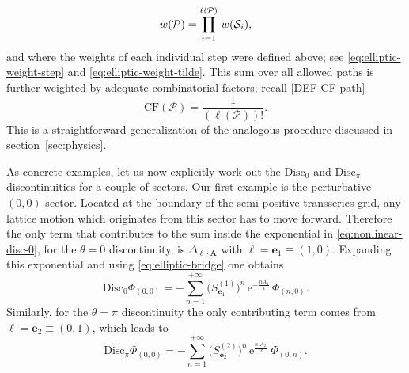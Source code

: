 \documentclass[11pt,a4paper]{article}
\newcommand{\CP}{{\cal P}}
\newcommand{\be}{\begin{equation}}
\newcommand{\ee}{\end{equation}}
\def\disc{{\mathrm{Disc}}}
\begin{document}
%
\begin{equation}
\label{eq:elliptic-weight-path}
w (\mathcal{P}) = \prod_{i=1}^{\ell (\CP)} \,w (\mathcal{S}_i),
\end{equation}
%
\noindent
and where the weights of each individual step were defined above; see \eqref{eq:elliptic-weight-step} and \eqref{eq:elliptic-weight-tilde}. This sum over all allowed paths is further weighted by adequate combinatorial factors; recall  \eqref{DEF-CF-path}
% 
\begin{equation}
\label{eq:elliptic-CF}
\mathrm{CF} (\mathcal{P}) = \frac{1}{\left(\ell (\mathcal{P})\right)!}.
\end{equation}
%
\noindent
This is a straightforward generalization of the analogous procedure discussed in section~\ref{sec:physics}.

As concrete examples, let us now explicitly work out the $\disc_0$ and $\disc_\pi$ discontinuities for a couple of sectors. Our first example is the perturbative $(0,0)$ sector. Located at the boundary of the semi-positive transseries grid, any lattice motion which originates from this sector has to move forward. Therefore the only term that contributes to the sum inside the exponential in \eqref{eq:nonlinear-disc-0}, for the $\theta=0$ discontinuity, is $\Delta_{\boldsymbol{\ell} \cdot \boldsymbol{A}}$ with $\boldsymbol{\ell} = \boldsymbol{e}_1 \equiv (1,0)$. Expanding this exponential and using \eqref{eq:elliptic-bridge} one obtains
%
\be
\label{00nonreso-the0-compare}
\disc_0 \Phi_{(0,0)} = - \sum_{n=1}^{+\infty} \big( S^{(1)}_{\boldsymbol{e}_1} \big)^n\, \mathrm{e}^{-\frac{n A_1}{x}}\, \Phi_{(n,0)}.
\ee
%
\noindent
Similarly, for the $\theta=\pi$ discontinuity the only contributing term comes from $\boldsymbol{\ell} = \boldsymbol{e}_2 \equiv (0,1)$, which leads to
%
\be
\label{00nonreso-thepi-compare}
\disc_\pi \Phi_{(0,0)} = - \sum_{n=1}^{+\infty} \big( S^{(2)}_{\boldsymbol{e}_2} \big)^n\, \mathrm{e}^{\frac{n |A_2|}{x}}\, \Phi_{(0,n)}.
\ee
\end{document}
